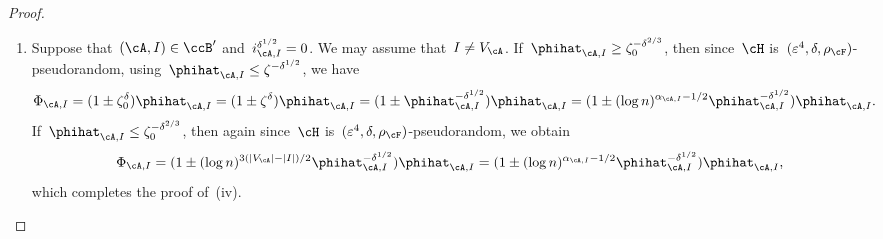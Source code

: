 \documentclass[11pt]{amsart}
\newcommand{\eps}{\varepsilon}
\DeclarePairedDelimiter{\paren}{\lparen}{\rparen}
\DeclarePairedDelimiter{\abs}{\lvert}{\rvert}
\def\phi{\varphi}
\theoremstyle{definition}
\numberwithin{equation}{section}
\begin{document}
\begin{proof}
\begin{enumerate}[label=\textup{(\roman*)}, topsep=0pt, wide]
			Let us turn to the details.
			The template~$(\cA,U)$ is strictly balanced and we have~$\phihat_{\cA,U}\geq \zeta_0^{-\delta^{2/3}}$, so since~$\cH$ is~$(\eps^4,\delta,\rho_\cF)$-pseudorandom, for all~$\phi\in\Phi_{\cA[U],\psi}$, we obtain
			\begin{equation*}
				\Phi_{\cA,\phi}
				=\paren[\bigg]{1\pm\paren[\bigg]{\frac{n^\delta}{n^{\eps^2}}\zeta}^\delta}\phihat_{\cA,U}
				=(1\pm \zeta^{\delta+2\delta^2})\phihat_{\cA,U}.
			\end{equation*}
			Furthermore, the template~$(\cA[U],I)$ is balanced and we have~$\phihat_{\cA[U],I}\geq \zeta^{-\delta^{4/7}(\abs{U}-\abs{I})}$, so by induction hypothesis, we obtain
			\begin{equation*}
				\Phi_{\cA,\psi}=(1\pm 2(\abs{U}-\abs{I})\zeta^{\delta+2\delta^2})\phihat_{\cA[U],I}.
			\end{equation*}
			Returning to~\eqref{equation: initial balanced templates split}, we conclude that
			\begin{equation*}
				\Phi_{\cA,\psi}
				=(1\pm 2(\abs{U}-\abs{I})\zeta^{\delta+2\delta^2})\phihat_{\cA[U],I}\cdot (1\pm \zeta^{\delta+2\delta^2})\phihat_{\cA,U}
				=(1\pm 2(\abs{V_\cA}-\abs{I})\zeta^{\delta+2\delta^2})\phihat_{\cA,I},
			\end{equation*}
			which completes the proof of~(iii).
			
			
			\item Suppose that~$(\cA,I)\in\ccB'$ and~$i_{\cA,I}^{\delta^{1/2}}=0$.
			We may assume that~$I\neq V_\cA$.
			If~$\phihat_{\cA,I}\geq \zeta_0^{-\delta^{2/3}}$, then since~$\cH$ is~$(\eps^4,\delta,\rho_\cF)$-pseudorandom, using~$\phihat_{\cA,I}\leq \zeta^{-\delta^{1/2}}$, we have
			\begin{equation*}
				\Phi_{\cA,I}
				=(1\pm\zeta_0^\delta)\phihat_{\cA,I}
				=(1\pm\zeta^\delta)\phihat_{\cA,I}
				=(1\pm \phihat_{\cA,I}^{-\delta^{1/2}})\phihat_{\cA,I}
				=(1\pm (\log n)^{\alpha_{\cA,I}-1/2}\phihat_{\cA,I}^{-\delta^{1/2}})\phihat_{\cA,I}.
			\end{equation*}
			If~$\phihat_{\cA,I}\leq \zeta_0^{-\delta^{2/3}}$, then again since~$\cH$ is~$(\eps^4,\delta,\rho_\cF)$-pseudorandom, we obtain
			\begin{equation*}
				\Phi_{\cA,I}
				=(1\pm (\log n)^{3(\abs{V_\cA}-\abs{I})/2}\phihat_{\cA,I}^{-\delta^{1/2}})\phihat_{\cA,I}
				=(1\pm (\log n)^{\alpha_{\cA,I}-1/2}\phihat_{\cA,I}^{-\delta^{1/2}})\phihat_{\cA,I},
			\end{equation*}
			which completes the proof of~(iv).\qedhere
		\end{enumerate}
	\end{proof}
	
\end{document}
